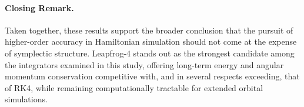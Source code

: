 \paragraph{Closing Remark.} Taken together, these results support the broader conclusion that the pursuit of
higher-order accuracy in Hamiltonian simulation should not come at the expense of symplectic structure.
Leapfrog-4 stands out as the strongest candidate among the integrators examined in this study, offering
long-term energy and angular momentum conservation competitive with, and in several respects exceeding, that
of RK4, while remaining computationally tractable for extended orbital simulations.